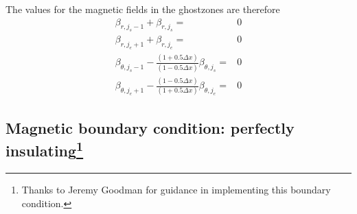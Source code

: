 \documentclass[letterpaper]{article}
\begin{document}
The values for the magnetic fields in the ghostzones are therefore
\begin{align}
\beta_{r, j_s-1} + \beta_{r, j_s} =& 0
\\
\beta_{r, j_e+1} + \beta_{r, j_e} =& 0
\\
\beta_{\theta, j_s-1} -
 \frac{(1 + 0.5\Delta x)}{(1 - 0.5\Delta x)}\beta_{\theta, j_s} =& 0
\\
\beta_{\theta, j_e+1} -
 \frac{(1 - 0.5\Delta x)}{(1 + 0.5\Delta x)}\beta_{\theta, j_e} =& 0
\end{align}

\subsection[Magnetic boundary condition: perfectly insulating]{Magnetic
boundary condition: perfectly
insulating\protect\footnote{Thanks to Jeremy Goodman for guidance in
implementing this boundary condition.}}
\end{document}
